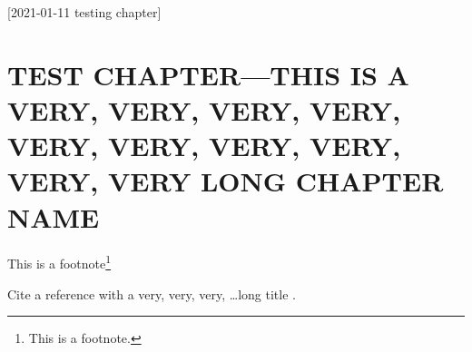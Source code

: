 [2021-01-11 testing chapter]

{
  \makeatletter
    \renewcommand\@makechapterhead[1]{{%
      \renewcommand{\baselinestretch}{1} \reset@font
      \large\bf\thechapter. #1\endgraf
    }}

    \chapter{TEST CHAPTER---THIS IS A VERY, VERY, VERY, VERY, VERY, VERY, VERY, VERY, VERY, VERY LONG CHAPTER NAME}
  \makeatother
}

This is a footnote\footnote{This is a footnote.}

Cite a reference with a very, very, very, \ldots long title
\cite{test-long-title}.
